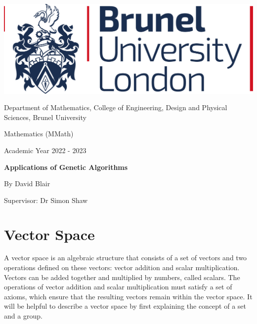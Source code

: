 \documentclass[a4paper,12pt]{article}
\begin{document}
	\vspace*{\fill}
	\begin{center}
		\includegraphics[scale = 0.15]{brunel logo.png}
		
		\vspace{1cm}
		\Large{Department of Mathematics, College of Engineering, Design and Physical Sciences, Brunel University}
		
		\vspace{1cm}
		\Large{Mathematics (MMath)}
		
		\vspace{1cm}
		\large{Academic Year 2022 - 2023}
		
		\vspace{1.5cm}
		\LARGE{\bf Applications of Genetic Algorithms}
		
		\vspace{1cm}
		\large{By David Blair}
		
		\vspace{0.1cm}
		\large{Supervisor: Dr Simon Shaw}
	\end{center}
	\vspace*{\fill}
	\newpage
	
	\tableofcontents
	
	\section{Vector Space}
	A vector space is an algebraic structure that consists of a set of vectors and two operations defined on these vectors: vector addition and scalar multiplication. Vectors can be added together and multiplied by numbers, called scalars. The operations of vector addition and scalar multiplication must satisfy a set of axioms, which ensure that the resulting vectors remain within the vector space. It will be helpful to describe a vector space by first explaining the concept of a set and a group. 
	
\end{document}
